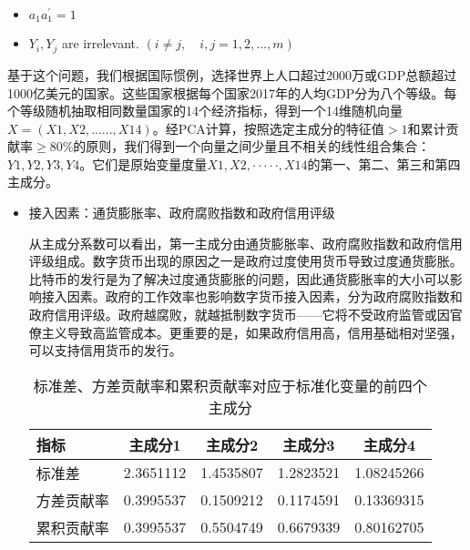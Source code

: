 \documentclass[withoutpreface,bwprint]{cumcmthesis} %
\begin{document}
\begin{itemize}
	\item $a_1 a_1^{\prime}=1$

	\item $Y_i, Y_j$ are irrelevant. $(i \neq j, \quad i, j=1,2, \ldots, m)$
\end{itemize}

基于这个问题，我们根据国际惯例，选择世界上人口超过2000万或GDP总额超过1000亿美元的国家。这些国家根据每个国家2017年的人均GDP分为八个等级。每个等级随机抽取相同数量国家的14个经济指标，得到一个14维随机向量$X = (X1, X2, ......, X14)$。经PCA计算，按照选定主成分的特征值$> 1$和累计贡献率$≥ 80\%$的原则，我们得到一个向量之间少量且不相关的线性组合集合：$Y1, Y2, Y3, Y4$。它们是原始变量度量$X1, X2, ·····, X14$的第一、第二、第三和第四主成分。
\begin{itemize}
	\item 接入因素：通货膨胀率、政府腐败指数和政府信用评级
	
	从主成分系数可以看出，第一主成分由通货膨胀率、政府腐败指数和政府信用评级组成。数字货币出现的原因之一是政府过度使用货币导致过度通货膨胀。比特币的发行是为了解决过度通货膨胀的问题，因此通货膨胀率的大小可以影响接入因素。政府的工作效率也影响数字货币接入因素，分为政府腐败指数和政府信用评级。政府越腐败，就越抵制数字货币——它将不受政府监管或因官僚主义导致高监管成本。更重要的是，如果政府信用高，信用基础相对坚强，可以支持信用货币的发行。
	
	\begin{table}[h]
		\centering
		\caption{标准差、方差贡献率和累积贡献率对应于标准化变量的前四个主成分}
		\label{tab4}
		\begin{tabular}{lcccc}
			\toprule[1.5pt]
			指标     & 主成分1 & 主成分2 & 主成分3 & 主成分4 \\ 
			\midrule[1pt]
			标准差      & 2.3651112 & 1.4535807 & 1.2823521 & 1.08245266 \\
			方差贡献率   & 0.3995537 & 0.1509212 & 0.1174591 & 0.13369315 \\
			累积贡献率   & 0.3995537 & 0.5504749 & 0.6679339 & 0.80162705 \\ 
			\bottomrule[1.5pt]
		\end{tabular}
	\end{table}
	

\end{itemize}
\end{document}
